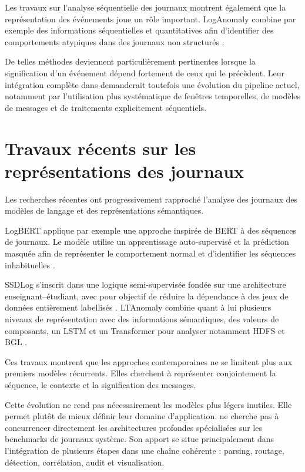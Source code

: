 Les travaux sur l'analyse séquentielle des journaux montrent également que la représentation des événements joue un rôle important. LogAnomaly combine par exemple des informations séquentielles et quantitatives afin d'identifier des comportements atypiques dans des journaux non structurés \cite{meng2019loganomaly}.

De telles méthodes deviennent particulièrement pertinentes lorsque la signification d'un événement dépend fortement de ceux qui le précèdent. Leur intégration complète dans \logminer{} demanderait toutefois une évolution du pipeline actuel, notamment par l'utilisation plus systématique de fenêtres temporelles, de modèles de messages et de traitements explicitement séquentiels.

\section{Travaux récents sur les représentations des journaux}

Les recherches récentes ont progressivement rapproché l'analyse des journaux des modèles de langage et des représentations sémantiques.

LogBERT applique par exemple une approche inspirée de BERT à des séquences de journaux. Le modèle utilise un apprentissage auto-supervisé et la prédiction masquée afin de représenter le comportement normal et d'identifier les séquences inhabituelles \cite{guo2021logbert}.

SSDLog s'inscrit dans une logique semi-supervisée fondée sur une architecture enseignant--étudiant, avec pour objectif de réduire la dépendance à des jeux de données entièrement labellisés \cite{lu2023ssdlog}. LTAnomaly combine quant à lui plusieurs niveaux de représentation avec des informations sémantiques, des valeurs de composants, un LSTM et un Transformer pour analyser notamment HDFS et BGL \cite{han2023ltanomaly}.

Ces travaux montrent que les approches contemporaines ne se limitent plus aux premiers modèles récurrents. Elles cherchent à représenter conjointement la séquence, le contexte et la signification des messages.

Cette évolution ne rend pas nécessairement les modèles plus légers inutiles. Elle permet plutôt de mieux définir leur domaine d'application. \logminer{} ne cherche pas à concurrencer directement les architectures profondes spécialisées sur les benchmarks de journaux système. Son apport se situe principalement dans l'intégration de plusieurs étapes dans une chaîne cohérente : parsing, routage, détection, corrélation, audit et visualisation.

